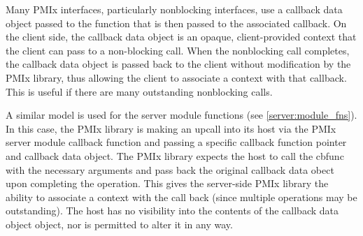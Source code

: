 Many \ac{PMIx} interfaces, particularly nonblocking interfaces, use a  callback data object passed to the function that is then passed to the associated callback. On the client side, the callback data object is an opaque, client-provided context that the client can pass to a non-blocking call. When the nonblocking call completes, the callback data object is passed back to the client without modification by the \ac{PMIx} library, thus allowing the client to associate a context with that callback. This is useful if there are many outstanding nonblocking calls.

A similar model is used for the server module functions (see \ref{server:module_fns}). In this case, the \ac{PMIx} library is making an upcall into its host via the \ac{PMIx} server module callback function and passing a specific callback function pointer and callback data object. The \ac{PMIx} library expects the host to call the cbfunc with the necessary arguments and pass back the original callback data obect upon completing the operation. This gives the server-side \ac{PMIx} library the ability to associate a context with the call back (since multiple operations may be outstanding). The host has no visibility into the contents of the callback data object object, nor is permitted to alter it in any way.

